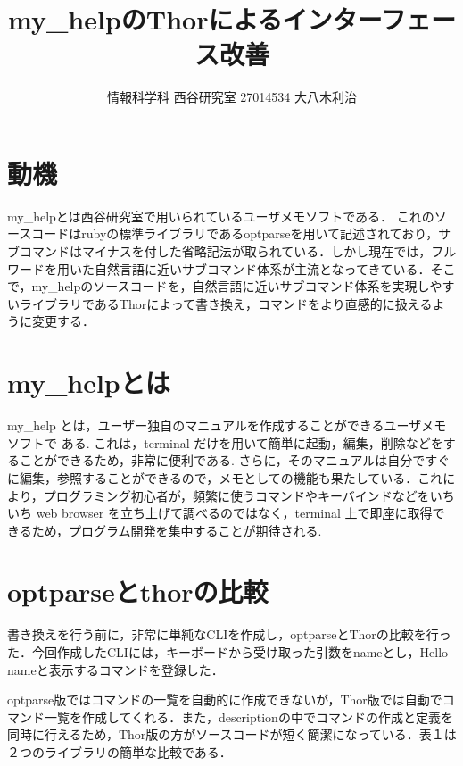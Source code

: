 \documentclass[a4j,twocolumn]{jsarticle}
\begin{document}
\title{my\_helpのThorによるインターフェース改善}
\author{\hspace{5mm} 情報科学科\hspace{5mm} 西谷研究室 \hspace{5mm} 27014534 \hspace{5mm} 大八木利治}
\date{}
\maketitle
\section{動機}
my\_helpとは西谷研究室で用いられているユーザメモソフトである．
これのソースコードはrubyの標準ライブラリであるoptparseを用いて記述されており，サブコマンドはマイナスを付した省略記法が取られている\cite{opt1}．しかし現在では，フルワードを用いた自然言語に近いサブコマンド体系が主流となってきている．そこで，my\_helpのソースコードを，自然言語に近いサブコマンド体系を実現しやすいライブラリであるThorによって書き換え，コマンドをより直感的に扱えるように変更する\cite{koichiro}．

\section{my\_helpとは}

my\_help とは，ユーザー独自のマニュアルを作成することができるユーザメモソフトで ある.
これは，terminal だけを用いて簡単に起動，編集，削除などをすることができるため，非常に便利である.
さらに，そのマニュアルは自分ですぐに編集，参照することができるので，メモとしての機能も果たしている．これにより，プログラミング初心者が，頻繁に使うコマンドやキーバインドなどをいちいち web browser を立ち上げて調べるのではなく，terminal 上で即座に取得できるため，プログラム開発を集中することが期待される.


\section{optparseとthorの比較}

書き換えを行う前に，非常に単純なCLIを作成し，optparseとThorの比較を行った．今回作成したCLIには，キーボードから受け取った引数をnameとし，Hello nameと表示するコマンドを登録した．

optparse版ではコマンドの一覧を自動的に作成できないが，Thor版では自動でコマンド一覧を作成してくれる．また，descriptionの中でコマンドの作成と定義を同時に行えるため，Thor版の方がソースコードが短く簡潔になっている．表１は２つのライブラリの簡単な比較である．
\end{document}
